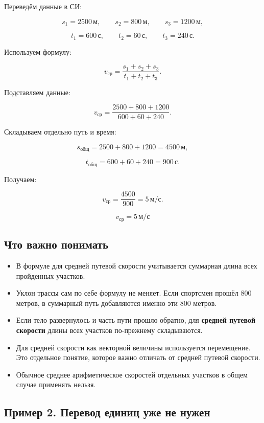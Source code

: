 \documentclass[a4paper,12pt]{article}
\newcommand{\avgv}{v_{\text{ср}}}
\newcommand{\unit}[1]{\,\text{#1}}
\begin{document}
Переведём данные в СИ:

\[
s_1=2500\unit{м},
\qquad
s_2=800\unit{м},
\qquad
s_3=1200\unit{м},
\]

\[
t_1=600\unit{с},
\qquad
t_2=60\unit{с},
\qquad
t_3=240\unit{с}.
\]

Используем формулу:

\[
\avgv=
\frac{s_1+s_2+s_3}
     {t_1+t_2+t_3}.
\]

Подставляем данные:

\[
\avgv=
\frac{2500+800+1200}
     {600+60+240}.
\]

Складываем отдельно путь и время:

\[
s_{\text{общ}}
=
2500+800+1200
=
4500\unit{м},
\]

\[
t_{\text{общ}}
=
600+60+240
=
900\unit{с}.
\]

Получаем:

\[
\avgv=
\frac{4500}{900}
=
5\unit{м/с}.
\]

\[
\boxed{\avgv=5\unit{м/с}}
\]

\subsection*{Что важно понимать}

\begin{itemize}

\item
В формуле для средней путевой скорости учитывается суммарная длина всех пройденных участков.

\item
Уклон трассы сам по себе формулу не меняет. Если спортсмен прошёл $800$ метров, в суммарный путь добавляются именно эти $800$ метров.

\item
Если тело развернулось и часть пути прошло обратно, для \textbf{средней путевой скорости} длины всех участков по-прежнему складываются.

\item
Для средней скорости как векторной величины используется перемещение. Это отдельное понятие, которое важно отличать от средней путевой скорости.

\item
Обычное среднее арифметическое скоростей отдельных участков в общем случае применять нельзя.

\end{itemize}

\subsection*{Пример 2. Перевод единиц уже не нужен}
\end{document}
